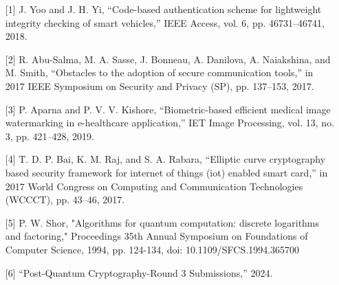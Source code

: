 {\footnotesize
\begin{itemize}
\item[] [1] J. Yoo and J. H. Yi, “Code-based authentication scheme for lightweight integrity checking of smart vehicles,” IEEE Access,
vol. 6, pp. 46731–46741, 2018.
\item[] [2] R. Abu-Salma, M. A. Sasse, J. Bonneau, A. Danilova, A. Naiakshina, and M. Smith, “Obstacles to the adoption of secure
communication tools,” in 2017 IEEE Symposium on Security and Privacy (SP), pp. 137–153, 2017.
\item[] [3] P. Aparna and P. V. V. Kishore, “Biometric-based efficient medical image watermarking in e-healthcare application,” IET
Image Processing, vol. 13, no. 3, pp. 421–428, 2019.
\item[] [4] T. D. P. Bai, K. M. Raj, and S. A. Rabara, “Elliptic curve cryptography based security framework for internet of things (iot)
enabled smart card,” in 2017 World Congress on Computing and Communication Technologies (WCCCT), pp. 43–46, 2017.
\item[] [5] P. W. Shor, "Algorithms for quantum computation: discrete logarithms and factoring," Proceedings 35th Annual Symposium on Foundations of Computer Science, 1994, pp. 124-134, doi: 10.1109/SFCS.1994.365700
\item[] [6] “Post-Quantum Cryptography-Round 3 Submissions,” 2024.
\end{itemize}


}









